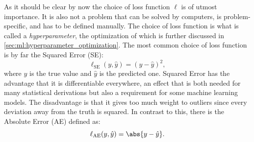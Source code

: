 As it should be clear by now the choice of loss function $\ell$ is of utmost importance. It is also not a problem that can be solved by computers, is problem-specific, and has to be defined manually. The choice of loss function is what is called a \emph{hyperparameter}, the optimization of which is further discussed in \autoref{sec:ml:hyperparameter_optimization}. The most common choice of loss function is by far the Squared Error (SE): 
\begin{equation}
  \ell_\mathrm{SE}(y, \hat{y}) = \left( y-\hat{y} \right)^2,
\end{equation}
where $y$ is the true value and $\hat{y}$ is the predicted one. Squared Error has the advantage that it is differentiable everywhere, an effect that is both needed for many statistical derivations but also a requirement for some machine learning models. The disadvantage is that it gives too much weight to outliers since every deviation away from the truth is squared. In contrast to this, there is the Absolute Error (AE) defined as:
\begin{equation}
  \ell_\mathrm{AE}(y, \hat{y})  = \abs{y-\hat{y} }.
\end{equation}

